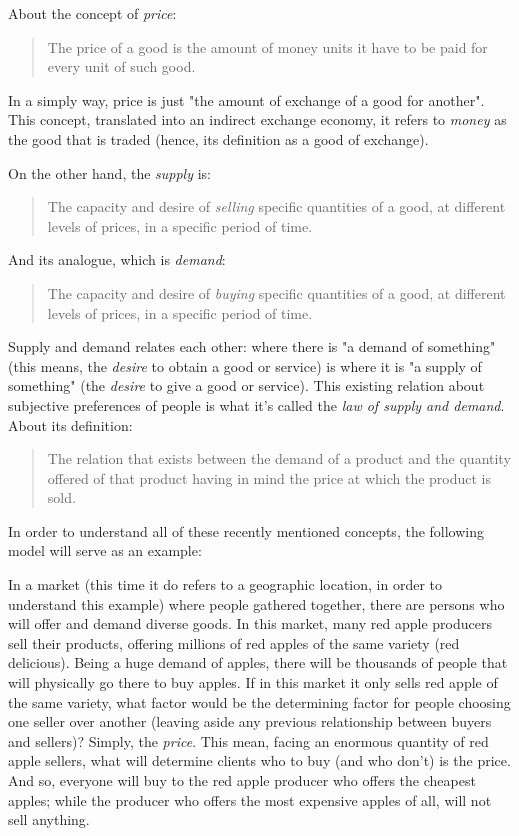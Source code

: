 \documentclass[12pt,a4paper,twoside]{book}
\begin{document}
About the concept of \textit{price}:

\begin{quotation}
The price of a good is the amount of money units it have to be paid for every unit of such good. \cite[p. 87]{mochobeker}
\end{quotation} 

In a simply way, price is just "the amount of exchange of a good for another". This concept, translated into an indirect exchange economy, it refers to \textit{money} as the good that is traded (hence, its definition as a good of exchange).

On the other hand, the \textit{supply} is:

\begin{quotation}
The capacity and desire of \textit{selling} specific quantities of a good, at different levels of prices, in a specific period of time. \cite[p. 87]{mochobeker}
\end{quotation}

And its analogue, which is \textit{demand}:

\begin{quotation}
The capacity and desire of \textit{buying} specific quantities of a good, at different levels of prices, in a specific period of time. \cite[p. 87]{mochobeker}
\end{quotation}

Supply and demand relates each other: where there is "a demand of something" (this means, the \textit{desire} to obtain a good or service) is where it is "a supply of something" (the \textit{desire} to give a good or service). This existing relation about subjective preferences of people is what it's called the \textit{law of supply and demand}. About its definition:

\begin{quotation}
The relation that exists between the demand of a product and the quantity offered of that product having in mind the price at which the product is sold. \cite{epedia:ley-o-d}
\end{quotation}

In order to understand all of these recently mentioned concepts, the following model will serve as an example:

In a market (this time it do refers to a geographic location, in order to understand this example) where people gathered together, there are persons who will offer and demand diverse goods. In this market, many red apple producers sell their products, offering millions of red apples of the same variety (red delicious). Being a huge demand of apples, there will be thousands of people that will physically go there to buy apples. If in this market it only sells red apple of the same variety, what factor would be the determining factor for people choosing one seller over another (leaving aside any previous relationship between buyers and sellers)? Simply, the \textit{price}. This mean, facing an enormous quantity of red apple sellers, what will determine clients who to buy (and who don't) is the price. And so, everyone will buy to the red apple producer who offers the cheapest	 apples; while the producer who offers the most expensive apples of all, will not sell anything.
\end{document}

